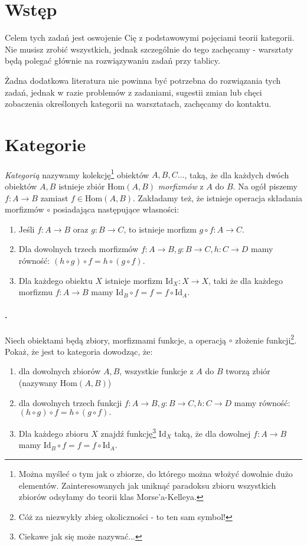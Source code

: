 \documentclass{article}
\newcounter{itemnum}
\newenvironment{prob}
{\stepcounter{itemnum}
\paragraph*{\arabic{itemnum}.}}
{}
\newcommand{\Hom}{\text{Hom}}
\newcommand{\Id}{\text{Id}}
\begin{document}
\section{Wstęp}
  Celem tych zadań jest oswojenie Cię z podstawowymi pojęciami teorii kategorii. Nie musisz zrobić wszystkich, jednak szczególnie do tego zachęcamy - warsztaty będą polegać głównie na rozwiązywaniu zadań przy tablicy.

  Żadna dodatkowa literatura nie powinna być potrzebna do rozwiązania tych zadań, jednak w razie problemów z zadaniami, sugestii zmian lub chęci zobaczenia określonych kategorii na warsztatach, zachęcamy do kontaktu.

\section{Kategorie}
\emph{Kategorią} nazywamy kolekcję\footnote{Można myśleć o tym jak o zbiorze, do którego można włożyć dowolnie dużo elementów. Zainteresowanych jak uniknąć paradoksu zbioru wszystkich zbiorów odsyłamy do teorii klas Morse'a-Kelleya.} obiektów $A, B, C\dots$, taką, że dla każdych dwóch obiektów $A, B$ istnieje zbiór $\Hom(A, B)$ \textit{morfizmów} z $A$ do $B$. Na ogół piszemy $f:A\to B$ zamiast $f\in \Hom(A,B)$. Zakładamy też, że istnieje operacja składania morfizmów $\circ$ posiadająca następujące własności:
\begin{enumerate}
  \item Jeśli $f:A\to B$ oraz $g: B\to C$, to istnieje morfizm $g\circ f: A\to C$.
  \item Dla dowolnych trzech morfizmów $f:A\to B, g:B\to C, h:C\to D$ mamy równość: $(h\circ g)\circ f = h\circ(g\circ f).$
  \item Dla każdego obiektu $X$ istnieje morfizm $\Id_X: X\to X$, taki że dla każdego morfizmu $f:A\to B$ mamy $\Id_B\circ f=f=f\circ\Id_A$.
\end{enumerate}

\begin{prob}
  Niech obiektami będą zbiory, morfizmami funkcje, a operacją $\circ$ złożenie funkcji\footnote{Cóż za niezwykły zbieg okoliczności - to ten sam symbol!}. Pokaż, że
  jest to kategoria dowodząc, że:
  \begin{enumerate}
    \item dla dowolnych zbiorów $A, B$, wszystkie funkcje z $A$ do $B$ tworzą zbiór (nazywany $\Hom(A,B)$)
    \item dla dowolnych trzech funkcji $f:A\to B, g:B\to C, h:C\to D$ mamy równość: $(h\circ g)\circ f = h\circ(g\circ f).$
    \item Dla każdego zbioru $X$ znajdź funkcję\footnote{Ciekawe jak się może nazywać...} $\Id_X$ taką, że dla dowolnej $f:A\to B$ mamy $\Id_B\circ f=f=f\circ\Id_A$.
  \end{enumerate}
\end{prob}
\end{document}
